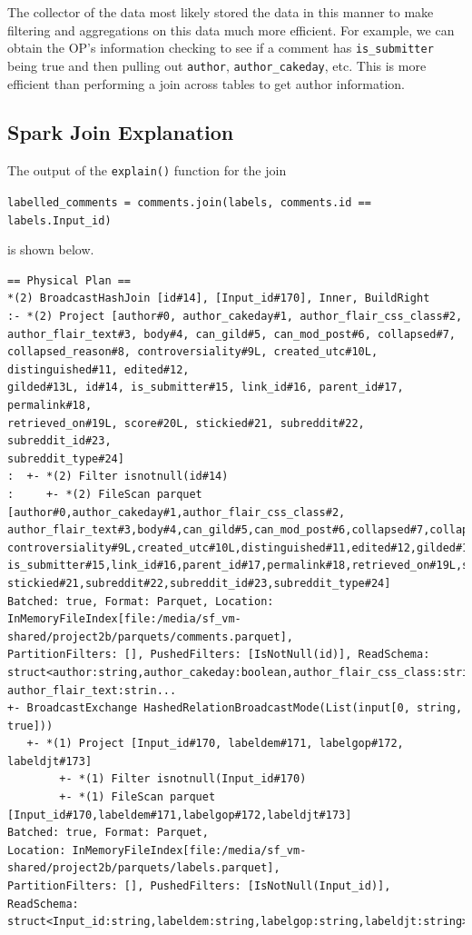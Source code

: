 \documentclass[12pt]{article}
\begin{document}
The collector of the data most likely stored the data in this manner to make filtering and aggregations on
this data much more efficient. For example, we can obtain the OP's information checking to see if a comment has
\texttt{is\_submitter} being true and then pulling out \texttt{author}, \texttt{author\_cakeday}, etc.
This is more efficient than performing a join across tables to get author information.

\subsection{Spark Join Explanation}

The output of the \texttt{explain()} function for the join
\begin{center}
        \scriptsize\texttt{labelled\_comments = comments.join(labels, comments.id == labels.Input\_id)}
\end{center}
is shown below.
{\scriptsize
\begin{verbatim}
== Physical Plan ==
*(2) BroadcastHashJoin [id#14], [Input_id#170], Inner, BuildRight
:- *(2) Project [author#0, author_cakeday#1, author_flair_css_class#2,
author_flair_text#3, body#4, can_gild#5, can_mod_post#6, collapsed#7,
collapsed_reason#8, controversiality#9L, created_utc#10L, distinguished#11, edited#12,
gilded#13L, id#14, is_submitter#15, link_id#16, parent_id#17, permalink#18,
retrieved_on#19L, score#20L, stickied#21, subreddit#22, subreddit_id#23,
subreddit_type#24]
:  +- *(2) Filter isnotnull(id#14)
:     +- *(2) FileScan parquet [author#0,author_cakeday#1,author_flair_css_class#2,
author_flair_text#3,body#4,can_gild#5,can_mod_post#6,collapsed#7,collapsed_reason#8,
controversiality#9L,created_utc#10L,distinguished#11,edited#12,gilded#13L,id#14,
is_submitter#15,link_id#16,parent_id#17,permalink#18,retrieved_on#19L,score#20L,
stickied#21,subreddit#22,subreddit_id#23,subreddit_type#24]
Batched: true, Format: Parquet, Location:
InMemoryFileIndex[file:/media/sf_vm-shared/project2b/parquets/comments.parquet],
PartitionFilters: [], PushedFilters: [IsNotNull(id)], ReadSchema:
struct<author:string,author_cakeday:boolean,author_flair_css_class:string,
author_flair_text:strin...
+- BroadcastExchange HashedRelationBroadcastMode(List(input[0, string, true]))
   +- *(1) Project [Input_id#170, labeldem#171, labelgop#172, labeldjt#173]
        +- *(1) Filter isnotnull(Input_id#170)
        +- *(1) FileScan parquet [Input_id#170,labeldem#171,labelgop#172,labeldjt#173]
Batched: true, Format: Parquet,
Location: InMemoryFileIndex[file:/media/sf_vm-shared/project2b/parquets/labels.parquet],
PartitionFilters: [], PushedFilters: [IsNotNull(Input_id)],
ReadSchema: struct<Input_id:string,labeldem:string,labelgop:string,labeldjt:string>
\end{verbatim}
}
\end{document}
